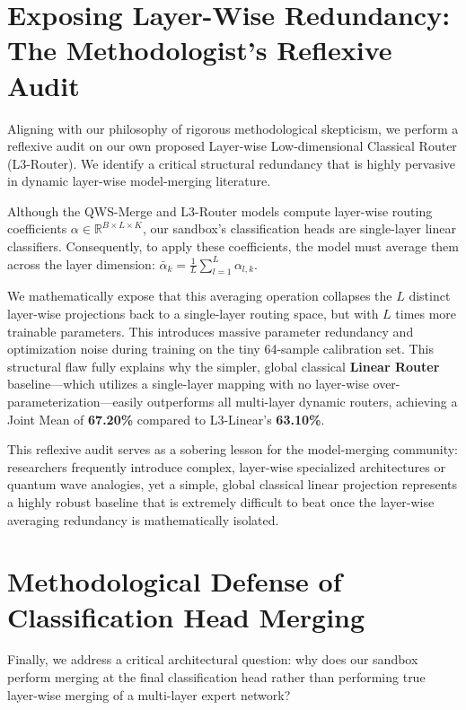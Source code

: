 \section{Exposing Layer-Wise Redundancy: The Methodologist's Reflexive Audit}
\label{sec:reflexive_audit_app}
Aligning with our philosophy of rigorous methodological skepticism, we perform a reflexive audit on our own proposed Layer-wise Low-dimensional Classical Router (L3-Router). We identify a critical structural redundancy that is highly pervasive in dynamic layer-wise model-merging literature. 

Although the QWS-Merge and L3-Router models compute layer-wise routing coefficients $\alpha \in \mathbb{R}^{B \times L \times K}$, our sandbox's classification heads are single-layer linear classifiers. Consequently, to apply these coefficients, the model must average them across the layer dimension: $\bar{\alpha}_k = \frac{1}{L} \sum_{l=1}^L \alpha_{l, k}$. 

We mathematically expose that this averaging operation collapses the $L$ distinct layer-wise projections back to a single-layer routing space, but with $L$ times more trainable parameters. This introduces massive parameter redundancy and optimization noise during training on the tiny 64-sample calibration set. This structural flaw fully explains why the simpler, global classical \textbf{Linear Router} baseline—which utilizes a single-layer mapping with no layer-wise over-parameterization—easily outperforms all multi-layer dynamic routers, achieving a Joint Mean of \textbf{67.20\%} compared to L3-Linear's \textbf{63.10\%}. 

This reflexive audit serves as a sobering lesson for the model-merging community: researchers frequently introduce complex, layer-wise specialized architectures or quantum wave analogies, yet a simple, global classical linear projection represents a highly robust baseline that is extremely difficult to beat once the layer-wise averaging redundancy is mathematically isolated.

\section{Methodological Defense of Classification Head Merging}
\label{sec:head_merging_defense_app}
Finally, we address a critical architectural question: why does our sandbox perform merging at the final classification head rather than performing true layer-wise merging of a multi-layer expert network? 

